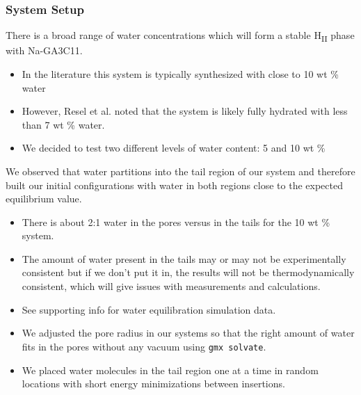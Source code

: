 \documentclass{article}
\begin{document}
  \subsubsection*{System Setup}

  There is a broad range of water concentrations which will form a stable 
  H\textsubscript{II} phase with Na-GA3C11. 
  \begin{itemize}
	\item In the literature this system is typically synthesized with close
	to 10 wt \% water
    \item However, Resel et al. noted that the system is likely fully 
	hydrated with less than 7 wt \% water.
	\item We decided to test two different levels of water content: 5 and 10 wt \%
  \end{itemize} 

  We observed that water partitions into the tail region of our system and therefore
  built our initial configurations with water in both regions close to the expected
  equilibrium value.
  \begin{itemize}
	\item There is about 2:1 water in the pores versus in the tails for the 10 wt \% system.
	\item The amount of water present in the tails may or may not be experimentally consistent
	but if we don't put it in, the results will not be thermodynamically consistent, which 
	will give issues with measurements and calculations.
	\item See supporting info for water equilibration simulation data.
	\item We adjusted the pore radius in our systems so that the right amount of water
	fits in the pores without any vacuum using \texttt{gmx solvate}.
	\item We placed water molecules in the tail region one at a time in random locations
	with short energy minimizations between insertions.
  \end{itemize}

\end{document}
